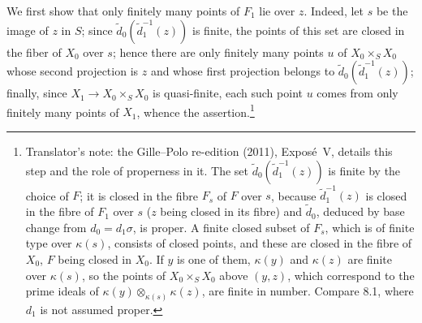 We first show that only finitely many points of \(F_1\) lie over
\(z\). Indeed, let \(s\) be the image of \(z\) in \(S\); since
\(\widetilde d_0(\widetilde d_1^{-1}(z))\) is finite, the points of this set
are closed in the fiber of \(X_0\) over \(s\); hence there are only finitely
many points \(u\) of \(X_0\times_SX_0\) whose second projection is \(z\) and
whose first projection belongs to \(\widetilde d_0(\widetilde d_1^{-1}(z))\);
finally, since \(X_1\to X_0\times_SX_0\) is quasi-finite, each such point
\(u\) comes from only finitely many points of \(X_1\), whence the assertion.\footnote{Translator's note: the Gille--Polo re-edition (2011), Exposé~V, details
this step and the role of properness in it. The set
\(\widetilde d_0(\widetilde d_1^{-1}(z))\) is finite by the choice of \(F\); it is
closed in the fibre \(F_s\) of \(F\) over \(s\), because
\(\widetilde d_1^{-1}(z)\) is closed in the fibre of \(F_1\) over \(s\) (\(z\) being
closed in its fibre) and \(\widetilde d_0\), deduced by base change from
\(d_0=d_1\sigma\), is proper. A finite closed subset of \(F_s\), which is of
finite type over \(\kappa(s)\), consists of closed points, and these are
closed in the fibre of \(X_0\), \(F\) being closed in \(X_0\). If \(y\) is one of
them, \(\kappa(y)\) and \(\kappa(z)\) are finite over \(\kappa(s)\), so the points
of \(X_0\times_SX_0\) above \((y,z)\), which correspond to the prime ideals of
\(\kappa(y)\otimes_{\kappa(s)}\kappa(z)\), are finite in number. Compare 8.1,
where \(d_1\) is not assumed proper.}
